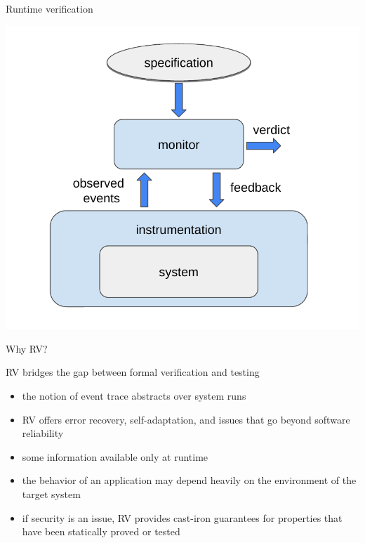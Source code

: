 \documentclass[10pt,usenames,dvipsnames]{beamer}
\begin{document}
\begin{frame}{Runtime verification}

  \begin{center}
    \includegraphics[keepaspectratio,height=0.7\textheight]{images/rv}
  \end{center}

\end{frame}


\begin{frame}{Why RV?}
  \begin{block}{RV bridges the gap between formal verification and testing}
    \begin{itemize}
    \item the notion of event trace abstracts over system runs
    \item RV offers error recovery, self-adaptation, and issues that go beyond software reliability
    \item some information available only at runtime
    \item the behavior of an application may depend heavily on the environment of the target system
    \item if security is an issue, RV provides cast-iron guarantees for properties that have been statically proved or tested
    \end{itemize}
  \end{block}
\end{frame}
\end{document}
